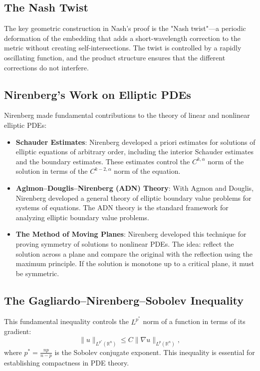 \subsection{The Nash Twist}

The key geometric construction in Nash's proof is the "Nash twist"---a periodic deformation of the embedding that adds a short-wavelength correction to the metric without creating self-intersections. The twist is controlled by a rapidly oscillating function, and the product structure ensures that the different corrections do not interfere.

\subsection{Nirenberg's Work on Elliptic PDEs}

Nirenberg made fundamental contributions to the theory of linear and nonlinear elliptic PDEs:
\begin{itemize}
\item \textbf{Schauder Estimates}: Nirenberg developed a priori estimates for solutions of elliptic equations of arbitrary order, including the interior Schauder estimates and the boundary estimates. These estimates control the $C^{k,\alpha}$ norm of the solution in terms of the $C^{k-2,\alpha}$ norm of the equation.
\item \textbf{Aglmon--Douglis--Nirenberg (ADN) Theory}: With Agmon and Douglis, Nirenberg developed a general theory of elliptic boundary value problems for systems of equations. The ADN theory is the standard framework for analyzing elliptic boundary value problems.
\item \textbf{The Method of Moving Planes}: Nirenberg developed this technique for proving symmetry of solutions to nonlinear PDEs. The idea: reflect the solution across a plane and compare the original with the reflection using the maximum principle. If the solution is monotone up to a critical plane, it must be symmetric.
\end{itemize}

\subsection{The Gagliardo--Nirenberg--Sobolev Inequality}

This fundamental inequality controls the $L^{p^*}$ norm of a function in terms of its gradient:
\[
\|u\|_{L^{p^*}(\mathbb{R}^n)} \leq C \|\nabla u\|_{L^p(\mathbb{R}^n)},
\]
where $p^* = \frac{np}{n-p}$ is the Sobolev conjugate exponent. This inequality is essential for establishing compactness in PDE theory.

